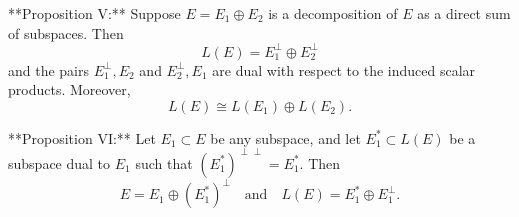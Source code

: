 **Proposition V:** Suppose $E = E_1 \oplus E_2$ is a decomposition of $E$ as a direct sum of subspaces. Then
$$L(E) = E_1^\perp \oplus E_2^\perp$$
and the pairs $E_1^\perp, E_2$ and $E_2^\perp, E_1$ are dual with respect to the induced scalar products. Moreover,
$$L(E) \cong L(E_1) \oplus L(E_2).$$

**Proposition VI:** Let $E_1 \subset E$ be any subspace, and let $E_1^* \subset L(E)$ be a subspace dual to $E_1$ such that $(E_1^*)^{\perp\perp} = E_1^*$. Then
$$E = E_1 \oplus (E_1^*)^\perp \quad \text{and} \quad L(E) = E_1^* \oplus E_1^\perp.$$
